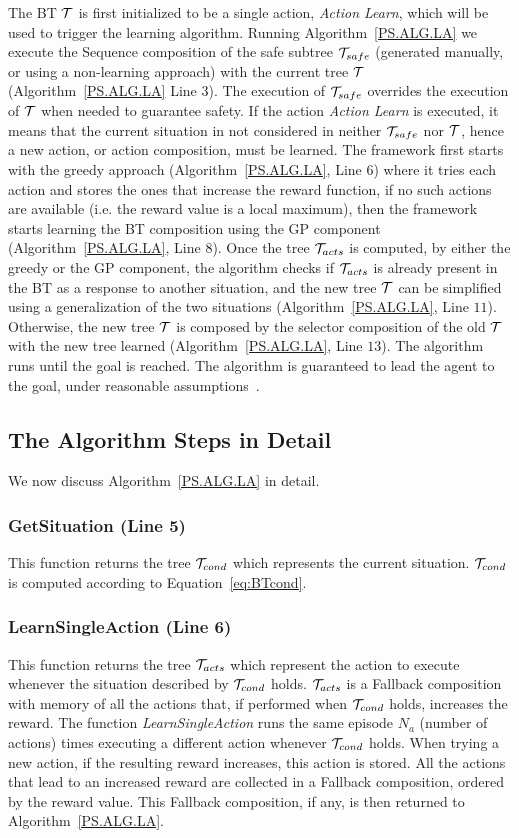 The BT $\mathcal{T}$ is first initialized to be a single action, \emph{Action Learn}, which will be used to trigger the learning algorithm. Running Algorithm~\ref{PS.ALG.LA}  we execute the Sequence composition of the safe subtree $\mathcal{T}_{safe}$ (generated manually, or using a non-learning approach) with the current tree $\mathcal{T}$ (Algorithm~\ref{PS.ALG.LA} Line $3$). The execution of $\mathcal{T}_{safe}$ overrides the execution of $\mathcal{T}$ when needed to guarantee safety. If the action \emph{Action Learn} is executed, it means that the current situation in not considered in neither $\mathcal{T}_{safe}$ nor $\mathcal{T}$, hence a new action, or action composition, must be learned. The framework first starts with the greedy approach (Algorithm~\ref{PS.ALG.LA}, Line $6$) where it tries each action and stores the ones that increase the reward function, if no such actions are available (i.e. the reward value is a local maximum), then the framework starts learning the BT composition using the GP component (Algorithm~\ref{PS.ALG.LA}, Line $8$). Once the tree $\mathcal{T}_{acts}$ is computed, by either the greedy or the GP component, the algorithm checks if $\mathcal{T}_{acts}$ is already present in the BT as a response to another situation, and the new tree $\mathcal{T}$ can be simplified using a generalization of the two situations (Algorithm~\ref{PS.ALG.LA}, Line $11$). Otherwise, the new tree $\mathcal{T}$ is composed by the selector composition of the old $\mathcal{T}$ with the new tree learned (Algorithm~\ref{PS.ALG.LA}, Line $13$). The algorithm runs until the goal is reached. The algorithm is guaranteed to lead the agent to the goal, under reasonable  assumptions~\cite{colledanchise2015learning}.




\subsection{The Algorithm Steps in Detail}
\label{LA.AS}
We now discuss Algorithm~\ref{PS.ALG.LA} in detail.
\subsubsection{GetSituation (Line 5)}
This function returns the tree $\mathcal{T}_{cond}$ which represents the current situation. $\mathcal{T}_{cond}$ is computed according to Equation~\eqref{eq:BTcond}.
\subsubsection{LearnSingleAction (Line 6)}
This function returns the tree $\mathcal{T}_{acts}$ which represent the action to execute whenever the situation described by $\mathcal{T}_{cond}$ holds. $\mathcal{T}_{acts}$ is a Fallback composition with memory of all the actions that, if performed when $\mathcal{T}_{cond}$ holds, increases the reward. The function \emph{LearnSingleAction} runs the same episode $N_a$ (number of actions) times executing a different action whenever $\mathcal{T}_{cond}$ holds. When trying a new action, if the resulting reward increases, this action is stored. All the actions that lead to an increased reward are collected in a Fallback composition, ordered by the reward value. This Fallback composition, if any, is then returned to Algorithm~\ref{PS.ALG.LA}. 

